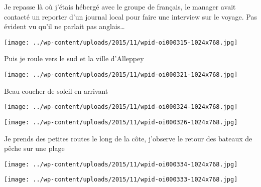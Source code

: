  

 Je repasse là où j'étais hébergé avec le groupe de français, le manager avait contacté un reporter d'un journal local pour faire une interview sur le voyage. Pas évident vu qu'il ne parlait pas anglais… 

 

\begin{center} \texttt{[image: ../wp-content/uploads/2015/11/wpid-oi000315-1024x768.jpg]} \end{center}

 

 Puis je roule vers le sud et la ville d'Alleppey 

 

\begin{center} \texttt{[image: ../wp-content/uploads/2015/11/wpid-oi000321-1024x768.jpg]} \end{center}

 

 Beau coucher de soleil en arrivant 

 

\begin{center} \texttt{[image: ../wp-content/uploads/2015/11/wpid-oi000324-1024x768.jpg]} \end{center}

 

 

\begin{center} \texttt{[image: ../wp-content/uploads/2015/11/wpid-oi000326-1024x768.jpg]} \end{center}

 

 Je prends des petites routes le long de la côte, j'observe le retour des bateaux de pêche sur une plage 

 

\begin{center} \texttt{[image: ../wp-content/uploads/2015/11/wpid-oi000334-1024x768.jpg]} \end{center}

 

 

\begin{center} \texttt{[image: ../wp-content/uploads/2015/11/wpid-oi000333-1024x768.jpg]} \end{center}

 

 

